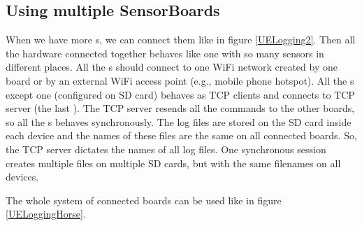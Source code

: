 \subsection{Using multiple SensorBoards}
When we have more s, we can connect them like in figure \ref{UELogging2}. Then all the hardware connected together behaves like one  with so many sensors in different places. All the s should connect to one WiFi network created by one board or by an external WiFi access point (e.g., mobile phone hotspot). All the s except one (configured on SD card) behaves as \ac{TCP} clients and connects to \ac{TCP} server (the last ). The \ac{TCP} server resends all the commands to the other boards, so all the s behaves synchronously. The log files are stored on the SD card inside each device and the names of these files are the same on all connected boards. So, the \ac{TCP} server dictates the names of all log files. One synchronous session creates multiple files on multiple SD cards, but with the same filenames on all devices.

The whole system of connected boards can be used like in figure \ref{UELoggingHorse}.
